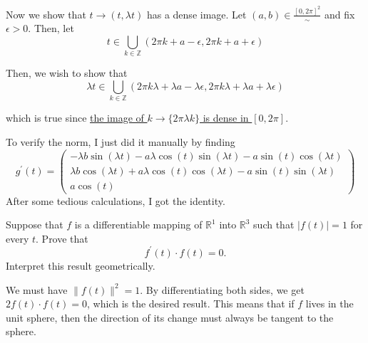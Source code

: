 \begin{solution}
\begin{enumerate}
				Now we show that $t \to (t, \lambda t)$ has a dense image. Let $(a, b) \in \frac{[0, 2\pi]^2}{\sim}$ and fix $\epsilon > 0$. Then, let 
				\begin{equation}
					t \in \bigcup_{k \in \mathbb{Z}} (2 \pi k + a - \epsilon, 2 \pi k + a + \epsilon)
				\end{equation} 

				Then, we wish to show that 
				\begin{equation}
					\lambda t \in \bigcup_{k \in \mathbb{Z}} (2 \pi k \lambda + \lambda a - \lambda \epsilon, 2 \pi k \lambda + \lambda a + \lambda \epsilon)
				\end{equation} 

				which is true since \hyperref[pst-thm:irrational_dense_in_unit]{the image of $k \to \{2 \pi \lambda k\}$ is dense in $[0, 2 \pi]$}. 

				To verify the norm, I just did it manually by finding 
				\begin{equation}
					g^\prime (t) = \begin{pmatrix} 
						-\lambda b \sin(\lambda t) - a \lambda \cos(t) \sin(\lambda t) - a \sin(t) \cos(\lambda t) \\ 
						\lambda b \cos(\lambda t) + a \lambda \cos(t) \cos(\lambda t) - a \sin(t) \sin(\lambda t) \\ 
						a \cos(t)
					\end{pmatrix}
				\end{equation}
				After some tedious calculations, I got the identity. 
		\end{enumerate}
	\end{solution}

	\begin{exercise}[Rudin 9.13]
		Suppose that $f$ is a differentiable mapping of $\mathbb{R}^1$ into $\mathbb{R}^3$ such that $\lvert f(t)\rvert=1$ for every $t$. Prove that
		\begin{equation}
			f^\prime(t)\cdot f(t)=0.
		\end{equation}
		Interpret this result geometrically.
	\end{exercise}
	\begin{solution}
	  We must have $\|f(t)\|^2 = 1$. By differentiating both sides, we get $2 f(t) \cdot f(t) = 0$, which is the desired result. This means that if $f$ lives in the unit sphere, then the direction of its change must always be tangent to the sphere. 
	\end{solution}

